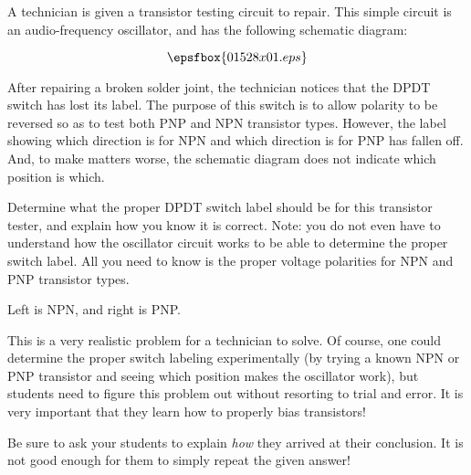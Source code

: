 

A technician is given a transistor testing circuit to repair.  This simple circuit is an audio-frequency oscillator, and has the following schematic diagram:

$$\epsfbox{01528x01.eps}$$

After repairing a broken solder joint, the technician notices that the DPDT switch has lost its label.  The purpose of this switch is to allow polarity to be reversed so as to test both PNP and NPN transistor types.  However, the label showing which direction is for NPN and which direction is for PNP has fallen off.  And, to make matters worse, the schematic diagram does not indicate which position is which.

Determine what the proper DPDT switch label should be for this transistor tester, and explain how you know it is correct.  Note: you do not even have to understand how the oscillator circuit works to be able to determine the proper switch label.  All you need to know is the proper voltage polarities for NPN and PNP transistor types.







Left is NPN, and right is PNP.







This is a very realistic problem for a technician to solve.  Of course, one could determine the proper switch labeling experimentally (by trying a known NPN or PNP transistor and seeing which position makes the oscillator work), but students need to figure this problem out without resorting to trial and error.  It is very important that they learn how to properly bias transistors!

Be sure to ask your students to explain {\it how} they arrived at their conclusion.  It is not good enough for them to simply repeat the given answer!




